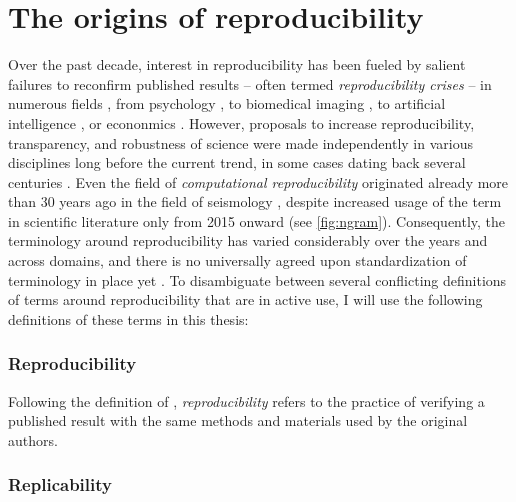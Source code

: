 \section{The origins of reproducibility}

Over the past decade, interest in reproducibility has been fueled by salient failures to reconfirm published results -- often termed \textit{reproducibility crises} -- in numerous fields \citep{baker20161}, from psychology \citep{open2015estimating}, to biomedical imaging \citep{wagner202310}, to artificial intelligence \citep{hutson2018artificial}, or econonmics \citep{camerer2016evaluating}.
However, proposals to increase reproducibility, transparency, and robustness of science were made independently in various disciplines long before the current trend, in some cases dating back several centuries \citep[such as Boyle (1666), as cited in][]{RobertBoylesDesigneaboutNaturalHistory}.
Even the field of \textit{computational reproducibility} originated already more than 30 years ago in the field of seismology \citep{claerbout1992electronic, buckheit1995wavelab}, despite increased usage of the term in scientific literature only from 2015 onward (see \cref{fig:ngram}).
Consequently, the terminology around reproducibility has varied considerably over the years and across domains, and there is no universally agreed upon standardization of terminology in place yet \citep{barba2018terminologies}.
To disambiguate between several conflicting definitions of terms around reproducibility that are in active use, I will use the following definitions of these terms in this thesis:

\subsubsection{Reproducibility}

Following the definition of \citet{peng2006}, \textit{reproducibility} refers to the practice of verifying a published result with the same methods and materials used by the original authors.

\subsubsection{Replicability}

